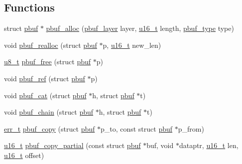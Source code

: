 \subsection*{Functions}
\begin{DoxyCompactItemize}
\item 
struct \hyperlink{structpbuf}{pbuf} $\ast$ \hyperlink{group__pbuf_ga8bb9c5d54a06995b1c67ce695ead9969}{pbuf\+\_\+alloc} (\hyperlink{group__pbuf_gaee1baa59bb2f85ba575b5a8619ac1ebf}{pbuf\+\_\+layer} layer, \hyperlink{group__compiler__abstraction_ga77570ac4fcab86864fa1916e55676da2}{u16\+\_\+t} length, \hyperlink{group__pbuf_gab7e0e32fcc292c0d7107721766ed92fb}{pbuf\+\_\+type} type)
\item 
void \hyperlink{group__pbuf_ga50abfe830a33a1a47a562febee66015d}{pbuf\+\_\+realloc} (struct \hyperlink{structpbuf}{pbuf} $\ast$p, \hyperlink{group__compiler__abstraction_ga77570ac4fcab86864fa1916e55676da2}{u16\+\_\+t} new\+\_\+len)
\item 
\hyperlink{group__compiler__abstraction_ga4caecabca98b43919dd11be1c0d4cd8e}{u8\+\_\+t} \hyperlink{group__pbuf_gab0dd696fb4b6bc65e548944584f1738b}{pbuf\+\_\+free} (struct \hyperlink{structpbuf}{pbuf} $\ast$p)
\item 
void \hyperlink{group__pbuf_ga77f6bbd69e45e542014d9c547c7da74e}{pbuf\+\_\+ref} (struct \hyperlink{structpbuf}{pbuf} $\ast$p)
\item 
void \hyperlink{group__pbuf_ga82429084fe29015509c9b4a072707cd4}{pbuf\+\_\+cat} (struct \hyperlink{structpbuf}{pbuf} $\ast$h, struct \hyperlink{structpbuf}{pbuf} $\ast$t)
\item 
void \hyperlink{group__pbuf_ga831c9a72bda1d3bd4c7b96f5a0e3b891}{pbuf\+\_\+chain} (struct \hyperlink{structpbuf}{pbuf} $\ast$h, struct \hyperlink{structpbuf}{pbuf} $\ast$t)
\item 
\hyperlink{group__infrastructure__errors_gaf02d9da80fd66b4f986d2c53d7231ddb}{err\+\_\+t} \hyperlink{group__pbuf_gaba88511dee3df4b631fde691f421320d}{pbuf\+\_\+copy} (struct \hyperlink{structpbuf}{pbuf} $\ast$p\+\_\+to, const struct \hyperlink{structpbuf}{pbuf} $\ast$p\+\_\+from)
\item 
\hyperlink{group__compiler__abstraction_ga77570ac4fcab86864fa1916e55676da2}{u16\+\_\+t} \hyperlink{group__pbuf_gac2f1f58fd36042e82af46f5015720899}{pbuf\+\_\+copy\+\_\+partial} (const struct \hyperlink{structpbuf}{pbuf} $\ast$buf, void $\ast$dataptr, \hyperlink{group__compiler__abstraction_ga77570ac4fcab86864fa1916e55676da2}{u16\+\_\+t} len, \hyperlink{group__compiler__abstraction_ga77570ac4fcab86864fa1916e55676da2}{u16\+\_\+t} offset)

\end{DoxyCompactItemize}
